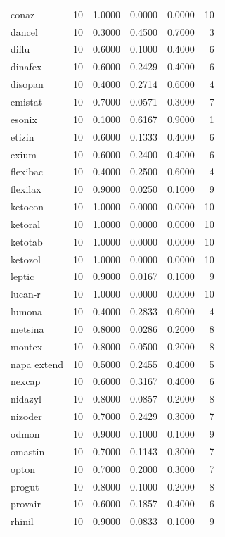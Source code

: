 \begin{longtable}{p{3.0cm}rrrrr}
conaz & 10 & 1.0000 & 0.0000 & 0.0000 & 10 \\
dancel & 10 & 0.3000 & 0.4500 & 0.7000 & 3 \\
diflu & 10 & 0.6000 & 0.1000 & 0.4000 & 6 \\
dinafex & 10 & 0.6000 & 0.2429 & 0.4000 & 6 \\
disopan & 10 & 0.4000 & 0.2714 & 0.6000 & 4 \\
emistat & 10 & 0.7000 & 0.0571 & 0.3000 & 7 \\
esonix & 10 & 0.1000 & 0.6167 & 0.9000 & 1 \\
etizin & 10 & 0.6000 & 0.1333 & 0.4000 & 6 \\
exium & 10 & 0.6000 & 0.2400 & 0.4000 & 6 \\
flexibac & 10 & 0.4000 & 0.2500 & 0.6000 & 4 \\
flexilax & 10 & 0.9000 & 0.0250 & 0.1000 & 9 \\
ketocon & 10 & 1.0000 & 0.0000 & 0.0000 & 10 \\
ketoral & 10 & 1.0000 & 0.0000 & 0.0000 & 10 \\
ketotab & 10 & 1.0000 & 0.0000 & 0.0000 & 10 \\
ketozol & 10 & 1.0000 & 0.0000 & 0.0000 & 10 \\
leptic & 10 & 0.9000 & 0.0167 & 0.1000 & 9 \\
lucan-r & 10 & 1.0000 & 0.0000 & 0.0000 & 10 \\
lumona & 10 & 0.4000 & 0.2833 & 0.6000 & 4 \\
metsina & 10 & 0.8000 & 0.0286 & 0.2000 & 8 \\
montex & 10 & 0.8000 & 0.0500 & 0.2000 & 8 \\
napa extend & 10 & 0.5000 & 0.2455 & 0.4000 & 5 \\
nexcap & 10 & 0.6000 & 0.3167 & 0.4000 & 6 \\
nidazyl & 10 & 0.8000 & 0.0857 & 0.2000 & 8 \\
nizoder & 10 & 0.7000 & 0.2429 & 0.3000 & 7 \\
odmon & 10 & 0.9000 & 0.1000 & 0.1000 & 9 \\
omastin & 10 & 0.7000 & 0.1143 & 0.3000 & 7 \\
opton & 10 & 0.7000 & 0.2000 & 0.3000 & 7 \\
progut & 10 & 0.8000 & 0.1000 & 0.2000 & 8 \\
provair & 10 & 0.6000 & 0.1857 & 0.4000 & 6 \\
rhinil & 10 & 0.9000 & 0.0833 & 0.1000 & 9 \\

\end{longtable}
